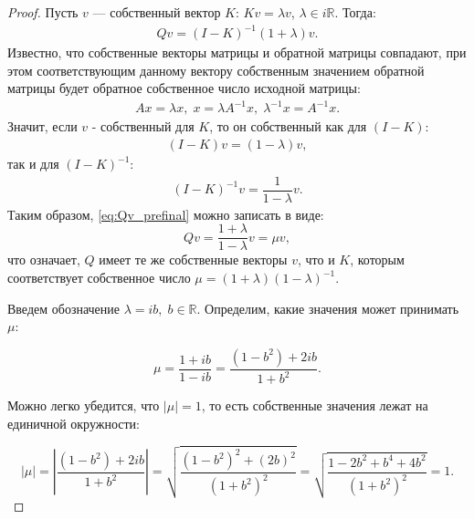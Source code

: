 \documentclass{article}
\newtheorem*{proof}{$\square$}
\newcommand{\R}{\mathbb{R}}
\begin{document}
\begin{proof}
		Пусть $v$ --- собственный вектор $K$: $Kv = \lambda v$, $\lambda \in i\R$. Тогда:
		\begin{equation}\begin{aligned}\label{eq:Qv_prefinal}
		Qv = (I - K)^{-1}(1 + \lambda) v.
		\end{aligned}\end{equation}
		Известно, что собственные векторы матрицы и обратной матрицы совпадают, при этом соответствующим данному вектору собственным значением обратной матрицы будет обратное собственное число исходной матрицы:
		\begin{equation*}\begin{aligned}
		Ax = \lambda x,\; x = \lambda A^{-1} x,\; \lambda^{-1} x = A^{-1} x.
		\end{aligned}\end{equation*}
		Значит, если $v$ - собственный для $K$, то он собственный как для $(I - K)$:
		\begin{equation*}\begin{aligned}
		(I - K) v = (1 - \lambda)v, 
		\end{aligned}\end{equation*}
		так и для $(I - K)^{-1}$:
		\begin{equation*}\begin{aligned}
		(I - K)^{-1} v = \dfrac{1}{1-\lambda} v.
		\end{aligned}\end{equation*}
		 Таким образом, \eqref{eq:Qv_prefinal} можно записать в виде:
		\begin{equation}
		Qv = \frac{1 + \lambda}{1 - \lambda} v = \mu v,
		\end{equation}
		что означает, $Q$ имеет те же собственные векторы $v$, что и $K$, которым соответствует собственное число $\mu = (1 + \lambda)(1 - \lambda)^{-1}$. 
		
		Введем обозначение $\lambda = i b,\; b\in\R$. Определим, какие значения может принимать $\mu$:
		
		\begin{equation}\label{eq:mu_b}
			\mu = \frac{1 + ib}{1 - ib} = \frac{(1-b^2) + 2ib}{1+b^2}.
		\end{equation}
		
		Можно легко убедится, что $|\mu|=1$, то есть собственные значения лежат на единичной окружности:
		
		\begin{equation*}
			|\mu| = \left|\frac{(1-b^2) + 2ib}{1+b^2}\right| = \sqrt{\frac{(1-b^2)^2 + (2b)^2}{(1+b^2)^2}} = \sqrt{\frac{1 -2b^2+b^4+4b^2}{(1+b^2)^2}} = 1.
		\end{equation*}
		

\end{proof}
\end{document}
